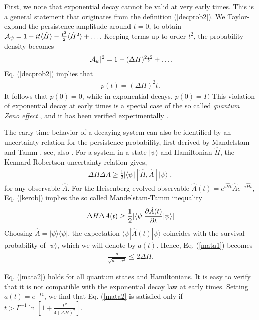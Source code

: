 \documentclass[12pt]{article}
\numberwithin{equation}{section}
\begin{document}
\medskip

 First, we note that exponential decay cannot be valid at very early times. This is a general statement that originates from the definition (\ref{decprob2}).
We Taylor-expand the persistence amplitude around $t = 0$, to obtain    ${\cal A}_{\psi} = 1 - i t \langle \hat{H} \rangle - \frac{t^2}{2} \langle \hat{H}^2 \rangle + \ldots$. Keeping terms up to order    $t^2$,
the probability density becomes
\begin{eqnarray}
|{\cal A}_{\psi} |^2 = 1 - (\Delta H)^2 t^2 + \ldots.
\end{eqnarray}
Eq.  (\ref{decprob2}) implies that
\begin{eqnarray}
p(t) =  (\Delta H)^2 t.
\end{eqnarray}
 It follows that $p(0) =0$, while in   exponential decays,  $p(0) = \Gamma$.  This violation of exponential decay at early times is a special case of the  so called {\em quantum Zeno effect} \cite{MiSu, FP08}, and it has been verified experimentally  \cite{Zeno}.

The early time behavior of a decaying system can also be identified by an uncertainty relation for the persistence probability, first derived by Mandelstam and Tamm \cite{MaTa45}, see, also \cite{Bhatta, Dodo}. For a system in a state $|\psi\rangle$ and Hamiltonian $\hat{H}$, the Kennard-Robertson uncertainty relation gives,
 \begin{eqnarray}
 \Delta H \Delta A \geq \frac{1}{2} |\langle \psi| [\hat{H}, \hat{A}]|\psi\rangle|, \label{kerob}
 \end{eqnarray}
 for any observable $\hat{A}$. For the Heisenberg evolved observable $\hat{A}(t) = e^{i\hat{H}t} \hat{A} e^{-i\hat{H}t}$,  Eq. (\ref{kerob}) implies the so called Mandelstam-Tamm inequality
\begin{eqnarray}
\Delta H \Delta A(t) \geq \frac{1}{2} \large|\langle \psi| \frac{\partial \hat{A}(t)}{\partial t} |\psi\rangle \large| \label{mata1}
\end{eqnarray}
Choosing   $\hat{A} = |\psi\rangle \langle \psi|$, the expectation $ \langle \psi|\hat{A}(t)|\psi\rangle$ coincides with the survival probability of $|\psi\rangle$, which we will denote by $a(t)$.  Hence, Eq.
 (\ref{mata1}) becomes
  \begin{eqnarray}
  \frac{|\dot{a}|}{ \sqrt{a-a^2}} \leq 2\Delta H. \label{mata2}
  \end{eqnarray}

  Eq. (\ref{mata2}) holds for all quantum states and Hamiltonians. It is easy to verify that it is  not compatible with the exponential decay law at early times. Setting $a(t) = e^{-\Gamma t}$, we find that Eq. (\ref{mata2} is satisfied only if $t > \Gamma^{-1} \ln \left[ 1 + \frac{\Gamma^2}{4 (\Delta H)^2}\right]$.
\end{document}
